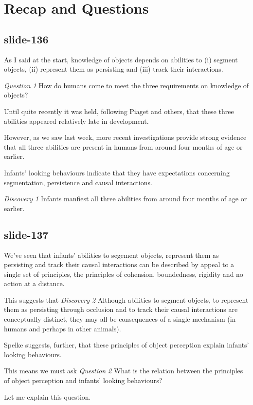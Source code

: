 \documentclass[12pt,\papersize]{extarticle}
\begin{document}
 
\section{Recap and Questions}
 
\subsection{slide-136}
As I said at the start, knowledge of objects depends on abilities to (i) segment objects, (ii) represent them as persisting and (iii) track their interactions.
 
\emph{Question 1}  How do humans come to meet the three requirements on knowledge of objects?
 
Until quite recently it was held, following Piaget and others, that these three abilities appeared relatively late in development.
 
However, as we saw last week, more recent investigations provide strong evidence that all three abilities are present in humans from around four months of age or earlier.
 
Infants' looking behaviours indicate that they have expectations concerning segmentation, persistence and causal interactions.
 
\emph{Discovery 1} Infants manfiest all three abilities from around four months of age or earlier.
 
\subsection{slide-137}
We've seen that infants' abilities to segement objects, represent them as persisting and track their causal 
interactions can be described by appeal to a single set of principles, 
the principles of cohension, boundedness, rigidity and no action at a distance.
 
This suggests that 
\emph{Discovery 2} Although abilities to segment objects, to represent them as persisting through occlusion and  to track their causal interactions are conceptually distinct, they may all be consequences of a single mechanism (in humans and perhaps in other animals).
 
Spelke suggests, further, that these principles of object perception explain infants' looking behaviours.
 
This means we must ask
\emph{Question 2} What is the relation between the principles of object perception and infants’ looking behaviours?
 
Let me explain this question.
 
\end{document}
